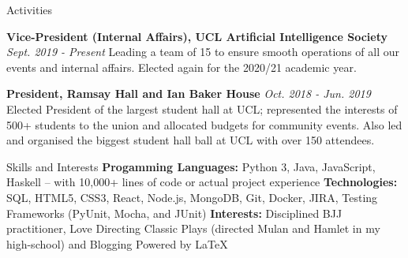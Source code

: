 \documentclass{resume}
\begin{document}
\begin{rSection}{\small{Activities}}

{\bf \footnotesize Vice-President (Internal Affairs), UCL Artificial Intelligence Society}
\hfill {\footnotesize \textit{Sept. 2019 - Present}} \newline
\footnotesize{Leading a team of 15 to ensure smooth operations of all our events and internal affairs. Elected again for the 2020/21 academic year.}

{\bf \footnotesize President, Ramsay Hall and Ian Baker House}
\hfill {\footnotesize \textit{Oct. 2018 - Jun. 2019}} \newline
\footnotesize{Elected President of the largest student hall at UCL; represented the interests of 500+ students to the union and allocated budgets for community events. Also led and organised the biggest student hall ball at UCL with over 150 attendees.}


\end{rSection}

\begin{rSection}{\small{Skills and Interests}}
{\footnotesize{\bf Progamming Languages:} \footnotesize{Python 3, Java, JavaScript, Haskell}}
\hfill \footnotesize{-- with 10,000+ lines of code or actual project experience}\newline
{\footnotesize{\bf Technologies:} \footnotesize{SQL, HTML5, CSS3, React, Node.js, MongoDB, Git, Docker, JIRA, Testing Frameworks (PyUnit, Mocha, and JUnit)}}\newline
{\footnotesize{\bf Interests:} \footnotesize{Disciplined BJJ practitioner, Love Directing Classic Plays (directed Mulan and Hamlet in my high-school) and Blogging}}
\newline
\hphantom{}
\hfill\tiny{Powered by \LaTeX}

\end{rSection}
\end{document}
